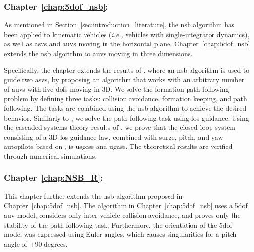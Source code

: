 
\subsubsection{Chapter~\ref{chap:5dof_nsb}: }

As mentioned in Section~\ref{sec:introduction_literature}, the \gls{nsb} algorithm has been applied to kinematic vehicles (\emph{i.e.,} vehicles with single-integrator dynamics), as well as \glspl{asv} and \glspl{auv} moving in the horizontal plane.
Chapter~\ref{chap:5dof_nsb} extends the \gls{nsb} algorithm to \glspl{auv} moving in three dimensions.

Specifically, the chapter extends the results of \cite{eek_formation_2021}, where an \gls{nsb} algorithm is used to guide two \glspl{asv}, by proposing an algorithm that works with an arbitrary number of \glspl{auv} with five \glspl{dof} moving in 3D.
We solve the formation path-following problem by defining three tasks: collision avoidance, formation keeping, and path following.
The tasks are combined using the \gls{nsb} algorithm to achieve the desired behavior.
Similarly to \cite{eek_formation_2021}, we solve the path-following task using \gls{los} guidance.
Using the cascaded systems theory results of \cite{pettersen_lyapunov_2017}, we prove that the closed-loop system consisting of a 3D \gls{los} guidance law, combined with surge, pitch, and yaw autopilots based on \cite{moe_LOS_2016}, is \glspl{usges} and \glspl{ugas}.
The theoretical results are verified through numerical simulations.

\subsubsection{Chapter~\ref{chap:NSB_R}: }

This chapter further extends the \gls{nsb} algorithm proposed in Chapter~\ref{chap:5dof_nsb}.
The algorithm in Chapter~\ref{chap:5dof_nsb} uses a 5\gls{dof} \gls{auv} model, considers only inter-vehicle collision avoidance, and proves only the stability of the path-following task.
Furthermore, the orientation of the 5\gls{dof} model was expressed using Euler angles, which causes singularities for a pitch angle of $\pm90$ degrees.

